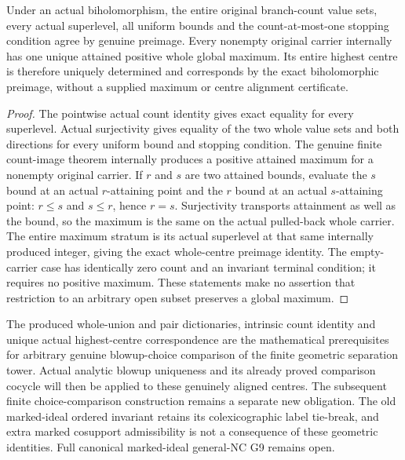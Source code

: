 \begin{theorem}
\label{hir:general-nc-biholomorphic-whole-highest-centre}
\leanok
{}
Under an actual biholomorphism, the entire original branch-count
value sets, every actual superlevel, all uniform bounds and the
count-at-most-one stopping condition agree by genuine preimage.
Every nonempty original carrier internally has one unique attained
positive whole global maximum. Its entire highest centre is
therefore uniquely determined and corresponds by the exact
biholomorphic preimage, without a supplied maximum or centre
alignment certificate.
\end{theorem}
\begin{proof}
The pointwise actual count identity gives exact equality for every
superlevel. Actual surjectivity gives equality of the two whole
value sets and both directions for every uniform bound and stopping
condition. The genuine finite count-image theorem internally
produces a positive attained maximum for a nonempty original
carrier. If $r$ and $s$ are two attained bounds, evaluate the $s$
bound at an actual $r$-attaining point and the $r$ bound at an actual
$s$-attaining point: $r\le s$ and $s\le r$, hence $r=s$.
Surjectivity transports attainment as well as the bound, so the
maximum is the same on the actual pulled-back whole carrier. The
entire maximum stratum is its actual superlevel at that same
internally produced integer, giving the exact whole-centre
preimage identity. The empty-carrier case has identically zero
count and an invariant terminal condition; it requires no positive
maximum. These statements make no assertion that restriction to
an arbitrary open subset preserves a global maximum.
\end{proof}

\begin{remark}
The produced whole-union and pair dictionaries, intrinsic count
identity and unique actual highest-centre correspondence are the
mathematical prerequisites for arbitrary genuine blowup-choice
comparison of the finite geometric separation tower. Actual analytic
blowup uniqueness and its already proved comparison cocycle will
then be applied to these genuinely aligned centres. The subsequent
finite choice-comparison construction remains a separate new
obligation. The old marked-ideal ordered invariant retains its
colexicographic label tie-break, and extra marked cosupport
admissibility is not a consequence of these geometric identities.
Full canonical marked-ideal general-NC G9 remains open.
\end{remark}
